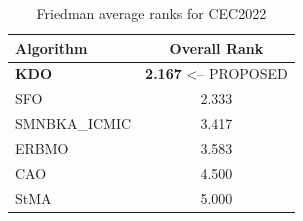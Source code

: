 \begin{table}[H]
\centering\small
\caption{Friedman average ranks for CEC2022}
\label{tab:cec2022_friedman}
\begin{tabular}{lc}
\toprule
\textbf{Algorithm} & \textbf{Overall Rank} \\
\midrule
\textbf{KDO} & \textbf{2.167}  <-- PROPOSED \\
SFO & 2.333 \\
SMNBKA_ICMIC & 3.417 \\
ERBMO & 3.583 \\
CAO & 4.500 \\
StMA & 5.000 \\
\bottomrule
\end{tabular}
\end{table}
